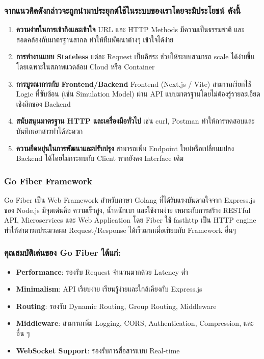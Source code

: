 \subsubsection{จากแนวคิดดังกล่าวจะถูกนํามาประยุกต์ใช้ในระบบของเราโดยจะมีประโยชน์ ดังนี้}
\begin{enumerate}
    \item \textbf{ความง่ายในการเข้าถึงและเข้าใจ}  
    URL และ HTTP Methods มีความเป็นธรรมชาติ และสอดคล้องกับมาตรฐานสากล ทำให้ทีมพัฒนาต่างๆ เข้าใจได้ง่าย
    \item \textbf{การทำงานแบบ Stateless}  
    แต่ละ Request เป็นอิสระ ช่วยให้ระบบสามารถ scale ได้ง่ายขึ้น โดยเฉพาะในสภาพแวดล้อม Cloud หรือ Container
    \item \textbf{การบูรณาการกับ Frontend/Backend}  
    Frontend (Next.js / Vite) สามารถเรียกใช้ Logic ที่ซับซ้อน (เช่น Simulation Model) ผ่าน API แบบมาตรฐานโดยไม่ต้องรู้รายละเอียดเชิงลึกของ Backend
    \item \textbf{สนับสนุนมาตรฐาน HTTP และเครื่องมือทั่วไป}  
    เช่น curl, Postman ทำให้การทดสอบและบันทึกเอกสารทำได้สะดวก
    \item \textbf{ความยืดหยุ่นในการพัฒนาและปรับปรุง}  
    สามารถเพิ่ม Endpoint ใหม่หรือเปลี่ยนแปลง Backend ได้โดยไม่กระทบกับ Client หากยังคง Interface เดิม
\end{enumerate}

\subsubsection{Go Fiber Framework}
\indent Go Fiber เป็น Web Framework สำหรับภาษา Golang ที่ได้รับแรงบันดาลใจจาก Express.js ของ Node.js มีจุดเด่นคือ ความเร็วสูง, น้ำหนักเบา และใช้งานง่าย เหมาะกับการสร้าง RESTful API, Microservices และ Web Application โดย Fiber ใช้ fasthttp เป็น HTTP engine ทำให้สามารถประมวลผล Request/Response ได้เร็วมากเมื่อเทียบกับ Framework อื่นๆ  

\subsubsection{คุณสมบัติเด่นของ Go Fiber ได้แก่:}
\begin{itemize}
    \item \textbf{Performance}: รองรับ Request จำนวนมากด้วย Latency ต่ำ  
    \item \textbf{Minimalism}: API เรียบง่าย เรียนรู้ง่ายและใกล้เคียงกับ Express.js  
    \item \textbf{Routing}: รองรับ Dynamic Routing, Group Routing, Middleware  
    \item \textbf{Middleware}: สามารถเพิ่ม Logging, CORS, Authentication, Compression, และอื่น ๆ  
    \item \textbf{WebSocket Support}: รองรับการสื่อสารแบบ Real-time  
\end{itemize}

